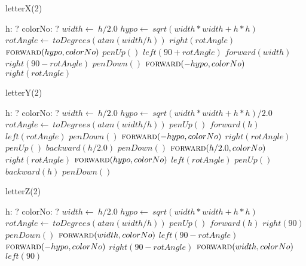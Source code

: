 \documentclass[a4paper,10pt]{article}
\begin{document}
\begin{algorithm}
\caption{letterX(2)}
\begin{algorithmic}[5]
\State {}
\State {}
    \State h: ?
    \State colorNo: ?
  \EndDecl
  \State \(width\gets\ h/2.0\)
  \State \(hypo\gets\ sqrt(width*width+h*h)\)
  \State \(rotAngle\gets\ toDegrees(atan(width/h))\)
  \State \(right(rotAngle)\)
  \State \(\Call{forward}{hypo,colorNo}\)
  \State \(penUp()\)
  \State \(left(90+rotAngle)\)
  \State \(forward(width)\)
  \State \(right(90-rotAngle)\)
  \State \(penDown()\)
  \State \(\Call{forward}{-hypo,colorNo}\)
  \State \(right(rotAngle)\)
\EndProcedure
\end{algorithmic}
\end{algorithm}


\begin{algorithm}
\caption{letterY(2)}
\begin{algorithmic}[5]
\State {}
\State {}
    \State h: ?
    \State colorNo: ?
  \EndDecl
  \State \(width\gets\ h/2.0\)
  \State \(hypo\gets\ sqrt(width*width+h*h)/2.0\)
  \State \(rotAngle\gets\ toDegrees(atan(width/h))\)
  \State \(penUp()\)
  \State \(forward(h)\)
  \State \(left(rotAngle)\)
  \State \(penDown()\)
  \State \(\Call{forward}{-hypo,colorNo}\)
  \State \(right(rotAngle)\)
  \State \(penUp()\)
  \State \(backward(h/2.0)\)
  \State \(penDown()\)
  \State \(\Call{forward}{h/2.0,colorNo}\)
  \State \(right(rotAngle)\)
  \State \(\Call{forward}{hypo,colorNo}\)
  \State \(left(rotAngle)\)
  \State \(penUp()\)
  \State \(backward(h)\)
  \State \(penDown()\)
\EndProcedure
\end{algorithmic}
\end{algorithm}


\begin{algorithm}
\caption{letterZ(2)}
\begin{algorithmic}[5]
\State {}
\State {}
    \State h: ?
    \State colorNo: ?
  \EndDecl
  \State \(width\gets\ h/2.0\)
  \State \(hypo\gets\ sqrt(width*width+h*h)\)
  \State \(rotAngle\gets\ toDegrees(atan(width/h))\)
  \State \(penUp()\)
  \State \(forward(h)\)
  \State \(right(90)\)
  \State \(penDown()\)
  \State \(\Call{forward}{width,colorNo}\)
  \State \(left(90-rotAngle)\)
  \State \(\Call{forward}{-hypo,colorNo}\)
  \State \(right(90-rotAngle)\)
  \State \(\Call{forward}{width,colorNo}\)
  \State \(left(90)\)
\EndProcedure
\end{algorithmic}
\end{algorithm}
\end{document}
